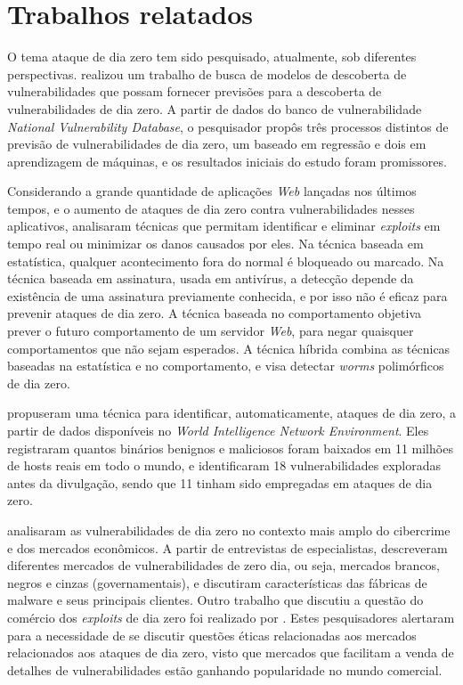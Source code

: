 \section{Trabalhos relatados}
O tema ataque de dia zero tem sido pesquisado, atualmente, sob diferentes perspectivas. \cite{Last:2016} realizou um trabalho de busca de modelos de descoberta de vulnerabilidades que possam fornecer previsões para a descoberta de vulnerabilidades de dia zero. A partir de dados do banco de vulnerabilidade \textit{National Vulnerability Database}, o pesquisador propôs três processos distintos de previsão de vulnerabilidades de dia zero, um baseado em regressão e dois em aprendizagem de máquinas, e os resultados iniciais do estudo foram promissores.

Considerando a grande quantidade de aplicações \textit{Web} lançadas nos últimos tempos, e o aumento de ataques de dia zero contra vulnerabilidades nesses aplicativos, \cite{Kumar:2016} analisaram técnicas que permitam identificar e eliminar \textit{exploits} em tempo real ou minimizar os danos causados por eles. Na técnica baseada em estatística, qualquer acontecimento fora do normal é bloqueado ou marcado. Na técnica baseada em assinatura, usada em antivírus, a detecção depende da existência de uma assinatura previamente conhecida, e por isso não é eficaz para prevenir ataques de dia zero. A técnica baseada no comportamento objetiva prever o futuro comportamento de um servidor \textit{Web}, para negar quaisquer comportamentos que não sejam esperados. A técnica híbrida combina as técnicas baseadas na estatística e no comportamento, e visa detectar \textit{worms} polimórficos de dia zero.

\cite{Bilge:2012} propuseram uma técnica para identificar, automaticamente, ataques de dia zero, a partir de dados disponíveis no \textit{World Intelligence Network Environment}. Eles registraram quantos binários benignos e maliciosos foram baixados em 11 milhões de hosts reais em todo o mundo, e identificaram 18 vulnerabilidades exploradas antes da divulgação, sendo que 11 tinham sido empregadas em ataques de dia zero.

\cite{Fotiet:2015} analisaram as vulnerabilidades de dia zero no contexto mais amplo do cibercrime e dos mercados econômicos. A partir de entrevistas de especialistas, descreveram diferentes mercados de vulnerabilidades de zero dia, ou seja, mercados brancos, negros e cinzas (governamentais), e discutiram características das fábricas de malware e seus principais clientes. Outro trabalho que discutiu a questão do comércio dos \textit{exploits} de dia zero foi realizado por \cite{Egelman:2013}. Estes pesquisadores alertaram para a necessidade de se discutir questões éticas relacionadas aos mercados relacionados aos ataques de dia zero, visto que mercados que facilitam a venda de detalhes de vulnerabilidades estão ganhando popularidade no mundo comercial.
